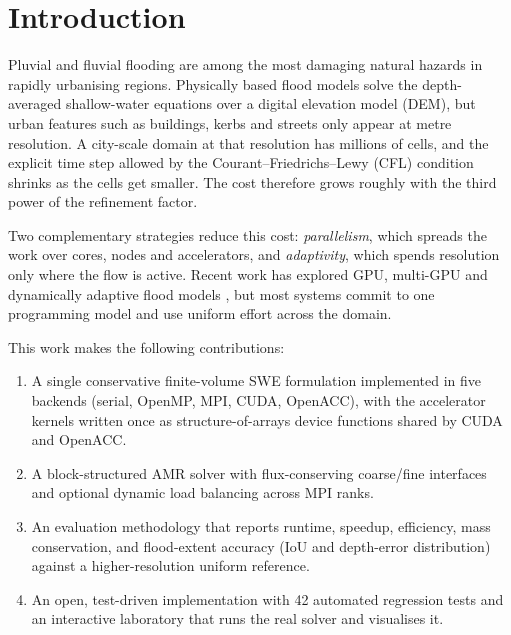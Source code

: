 \documentclass[conference]{IEEEtran}
\begin{document}
\section{Introduction}
Pluvial and fluvial flooding are among the most damaging natural hazards in
rapidly urbanising regions. Physically based flood models solve the
depth-averaged shallow-water equations over a digital elevation model (DEM),
but urban features such as buildings, kerbs and streets only appear at metre
resolution. A city-scale domain at that resolution has millions of cells, and
the explicit time step allowed by the Courant--Friedrichs--Lewy (CFL)
condition shrinks as the cells get smaller. The cost therefore grows roughly
with the third power of the refinement factor.

Two complementary strategies reduce this cost: \emph{parallelism}, which
spreads the work over cores, nodes and accelerators, and \emph{adaptivity},
which spends resolution only where the flow is active. Recent work has
explored GPU, multi-GPU and dynamically adaptive flood models
\cite{saleem2024,rong2024,wang2024,chen2025,dong2025,chowdhury2025}, but most
systems commit to one programming model and use uniform effort across the
domain.

This work makes the following contributions:
\begin{enumerate}
\item A single conservative finite-volume SWE formulation implemented in five
backends (serial, OpenMP, MPI, CUDA, OpenACC), with the accelerator kernels
written once as structure-of-arrays device functions shared by CUDA and OpenACC.
\item A block-structured AMR solver with flux-conserving coarse/fine interfaces
and optional dynamic load balancing across MPI ranks.
\item An evaluation methodology that reports runtime, speedup, efficiency,
mass conservation, and flood-extent accuracy (IoU and depth-error
distribution) against a higher-resolution uniform reference.
\item An open, test-driven implementation with 42 automated regression tests
and an interactive laboratory that runs the real solver and visualises it.
\end{enumerate}

\end{document}
